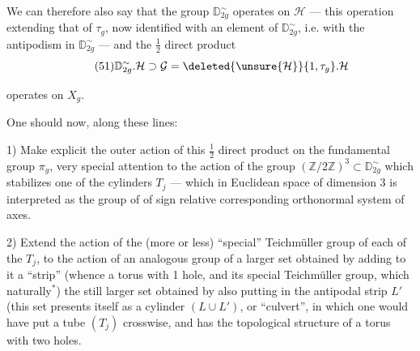 We can therefore also say that the group $\mathbb D_{2g}^\sim$
operates on $\mathcal H$ --- this operation extending that
of $\tau_g$, now identified with an
element of $\mathbb D_{2g}^\sim$, i.e. with the antipodism in
$\mathbb D_{2g}^\sim$ --- and the $\frac12$ direct product
\[
\tag{51}
\mathbb D_{2g}^\sim.\mathcal H\supset\mathcal G
=\deleted{\unsure{\mathcal H}}\{1,\tau_g\}.\mathcal H
\]



operates on $X_g$.

One should now, along these lines:

1) Make explicit the outer action of this $\frac12$ direct product on the fundamental group $\pi_g$,  very special attention to the action of the group $(\mathbb Z/2\mathbb Z)^3\subset\mathbb D_{2g}^{\sim}$ which stabilizes one of the cylinders $T_j$ --- which in Euclidean space of dimension 3 is interpreted as the group of  of sign relative  corresponding orthonormal system of axes.

2) Extend the action  of the (more or less) ``special'' Teichmüller group of each of the $T_j$, to the action of an analogous group of a larger set obtained by adding to it a ``strip''  (whence a torus with 1 hole, and its special Teichmüller group, which  naturally$^*$)  the still larger set obtained by also putting in the antipodal strip $L'$ (this set presents itself as a cylinder $(L\cup L')$, or ``culvert'', in which one would have put a tube $(T_j)$ crosswise, and has the topological structure of a torus with two holes.

